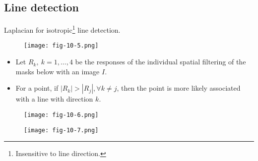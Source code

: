 \subsection{Line detection}

\begin{frame}
Laplacian for isotropic\footnote{Insensitive to line direction.} line detection.
\begin{figure}[!h]
\texttt{[image: fig-10-5.png]}
\end{figure}
\end{frame}

\begin{frame}
\begin{itemize}
\item Let $R_k,\ k=1,\ldots,4$ be the responses of the individual spatial filtering of the masks below with an image $I$.
\item For a point, if $|R_{k}| > |R_{j}|, \forall k\neq j$, then the point is more likely associated with a line with direction $k$.
\end{itemize}
\begin{figure}[!h]
\texttt{[image: fig-10-6.png]}
\end{figure}
\end{frame}

\begin{frame}
\begin{figure}[!h]
\texttt{[image: fig-10-7.png]}
\end{figure}
\end{frame}

